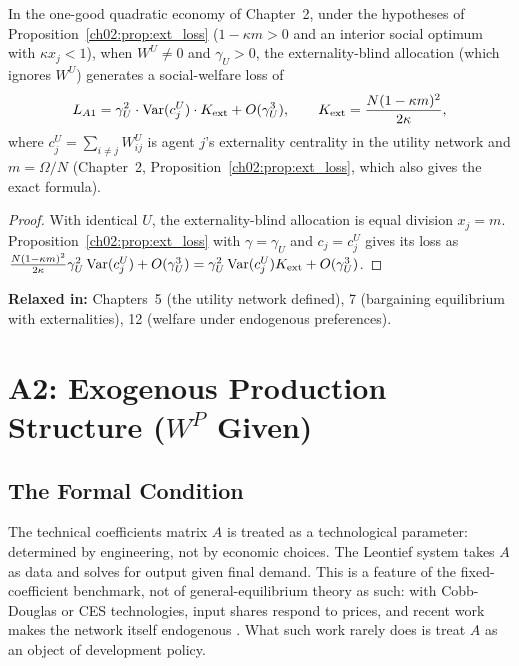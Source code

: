 \documentclass[../structural_economics_book.tex]{subfiles}
\begin{document}
\begin{proposition}\label{ch04:prop:A1_cost}
In the one-good quadratic economy of Chapter~2, under the hypotheses of Proposition~\ref{ch02:prop:ext_loss} ($1 - \kappa m > 0$ and an interior social optimum with $\kappa x_j < 1$), when $W^U \neq 0$ and $\gamma_U > 0$, the externality-blind allocation (which ignores $W^U$) generates a social-welfare loss of
\begin{equation}\label{ch04:eq:A1_loss}
L_{A1} = \gamma_U^2 \cdot \operatorname{Var}(c_j^U) \cdot K_{\text{ext}} + O(\gamma_U^3), \qquad K_{\text{ext}} = \frac{N(1-\kappa m)^2}{2\kappa},
\end{equation}
where $c_j^U = \sum_{i \neq j} W^U_{ij}$ is agent $j$'s externality centrality in the utility network and $m = \Omega/N$ (Chapter~2, Proposition~\ref{ch02:prop:ext_loss}, which also gives the exact formula).
\end{proposition}

\begin{proof}
With identical $U$, the externality-blind allocation is equal division $x_j = m$. Proposition~\ref{ch02:prop:ext_loss} with $\gamma = \gamma_U$ and $c_j = c_j^U$ gives its loss as $\frac{N(1-\kappa m)^2}{2\kappa}\gamma_U^2\operatorname{Var}(c_j^U) + O(\gamma_U^3) = \gamma_U^2\operatorname{Var}(c_j^U)K_{\text{ext}} + O(\gamma_U^3)$.
\end{proof}

\textbf{Relaxed in:} Chapters~5 (the utility network defined), 7 (bargaining equilibrium with externalities), 12 (welfare under endogenous preferences).


\section{A2: Exogenous Production Structure ($W^P$ Given)}
\label{ch04:sec:A2}

\subsection{The Formal Condition}

The technical coefficients matrix $A$ is treated as a technological parameter: determined by engineering, not by economic choices. The Leontief system takes $A$ as data and solves for output given final demand. This is a feature of the fixed-coefficient benchmark, not of general-equilibrium theory as such: with Cobb-Douglas or CES technologies, input shares respond to prices, and recent work makes the network itself endogenous \citep{oberfield2018theory,acemoglu2020endogenous}. What such work rarely does is treat $A$ as an object of development policy.
\end{document}
